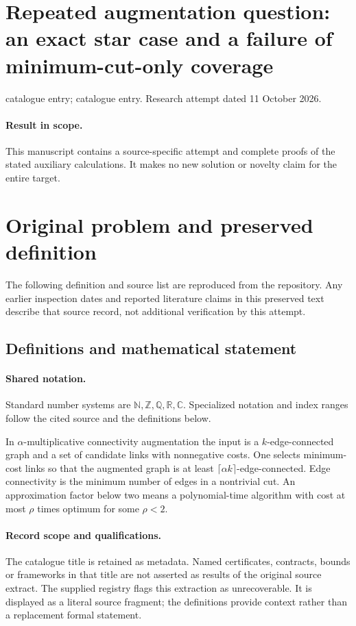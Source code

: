 \documentclass[11pt]{article}
\begin{document}
\section*{Repeated augmentation question: an exact star case and a failure of minimum-cut-only coverage}
\noindent catalogue entry; catalogue entry. Research attempt dated 11 October 2026.
\paragraph{Result in scope.}This manuscript contains a source-specific attempt and complete proofs of the stated auxiliary calculations. It makes no new solution or novelty claim for the entire target.
\section{Original problem and preserved definition}
The following definition and source list are reproduced from the repository. Any earlier inspection dates and reported literature claims in this preserved text describe that source record, not additional verification by this attempt.
\subsection{Definitions and mathematical statement}

\paragraph{Shared notation.}Standard number systems are $\mathbb N,\mathbb Z,\mathbb Q,\mathbb R,\mathbb C$. Specialized notation and index ranges follow the cited source and the definitions below.


In $\alpha$-multiplicative connectivity augmentation the input is a $k$-edge-connected graph and a set of candidate links with nonnegative costs. One selects minimum-cost links so that the augmented graph is at least $\lceil\alpha k\rceil$-edge-connected. Edge connectivity is the minimum number of edges in a nontrivial cut. An approximation factor below two means a polynomial-time algorithm with cost at most $\rho$ times optimum for some $\rho<2$.
\paragraph{Record scope and qualifications.}
The catalogue title is retained as metadata. Named certificates, contracts, bounds or frameworks in that title are not asserted as results of the original source extract.
The supplied registry flags this extraction as unrecoverable. It is displayed as a literal source fragment; the definitions provide context rather than a replacement formal statement.
\end{document}
